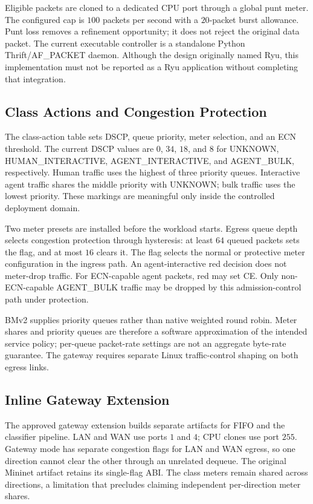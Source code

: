Eligible packets are cloned to a dedicated CPU port through a global punt meter. The
configured cap is $100$ packets per second with a $20$-packet burst allowance. Punt loss
removes a refinement opportunity; it does not reject the original data packet.
The current executable controller is a standalone Python Thrift/AF\_PACKET daemon.
Although the design originally named Ryu, this implementation must not be reported as a
Ryu application without completing that integration.

\subsection{Class Actions and Congestion Protection}

The class-action table sets DSCP, queue priority, meter selection, and an ECN threshold.
The current DSCP values are $0$, $34$, $18$, and $8$ for UNKNOWN, HUMAN\_INTERACTIVE,
AGENT\_INTERACTIVE, and AGENT\_BULK, respectively. Human traffic uses the highest of three
priority queues. Interactive agent traffic shares the middle priority with UNKNOWN;
bulk traffic uses the lowest priority. These markings are meaningful only inside the
controlled deployment domain.

Two meter presets are installed before the workload starts. Egress queue depth selects
congestion protection through hysteresis: at least $64$ queued packets sets the flag,
and at most $16$ clears it. The flag selects the normal or protective meter configuration
in the ingress path. An agent-interactive red decision does not meter-drop traffic.
For ECN-capable agent packets, red may set CE. Only non-ECN-capable AGENT\_BULK traffic may
be dropped by this admission-control path under protection.

BMv2 supplies priority queues rather than native weighted round robin. Meter shares and
priority queues are therefore a software approximation of the intended service policy;
per-queue packet-rate settings are not an aggregate byte-rate guarantee. The gateway
requires separate Linux traffic-control shaping on both egress links.

\subsection{Inline Gateway Extension}

The approved gateway extension builds separate artifacts for FIFO and the classifier
pipeline. LAN and WAN use ports $1$ and $4$; CPU clones use port $255$. Gateway mode has
separate congestion flags for LAN and WAN egress, so one direction cannot clear the other
through an unrelated dequeue. The original Mininet artifact retains its single-flag ABI.
The class meters remain shared across directions, a limitation that precludes claiming
independent per-direction meter shares.

